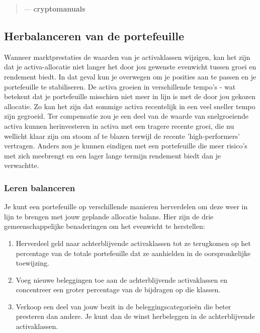     \begin{quotation}
          \textit{}
          \begin{flushright}
            \small{--- \textbf{cryptomanuals}}
          \end{flushright}
    \end{quotation}


\subsection{Herbalanceren van de portefeuille}
Wanneer marktprestaties de waarden van je activaklassen wijzigen, kan het zijn dat je activa-allocatie niet langer het door jou gewenste evenwicht tussen groei en rendement biedt. In dat geval kun je overwegen om je posities aan te passen en je portefeuille te stabiliseren. De activa groeien in verschillende tempo's - wat betekent dat je portefeuille misschien niet meer in lijn is met de door jou gekozen allocatie. Zo kan het zijn dat sommige activa recentelijk in een veel sneller tempo zijn gegroeid. Ter compensatie zou je een deel van de waarde van snelgroeiende activa kunnen herinvesteren in activa met een tragere recente groei, die nu wellicht klaar zijn om stoom af te blazen terwijl de recente 'high-performers' vertragen. Anders zou je kunnen eindigen met een portefeuille die meer risico's met zich meebrengt en een lager lange termijn rendement biedt dan je verwachtte.\medskip 

\subsubsection*{Leren balanceren}
Je kunt een portefeuille op verschillende manieren herverdelen om deze weer in lijn te brengen met jouw geplande allocatie balans. Hier zijn de drie gemeenschappelijke benaderingen om het evenwicht te herstellen:

\begin{enumerate}[label=(\alph*)]
    \item Herverdeel geld naar achterblijvende activaklassen tot ze terugkomen op het percentage van de totale portefeuille dat ze aanhielden in de oorspronkelijke toewijzing.
    \item Voeg nieuwe beleggingen toe aan de achterblijvende activaklassen en concentreer een groter percentage van de bijdragen op die klassen.
    \item Verkoop een deel van jouw bezit in de beleggingscategorie\"en die beter presteren dan andere. Je kunt dan de winst herbeleggen in de achterblijvende activaklassen.
\end{enumerate}

